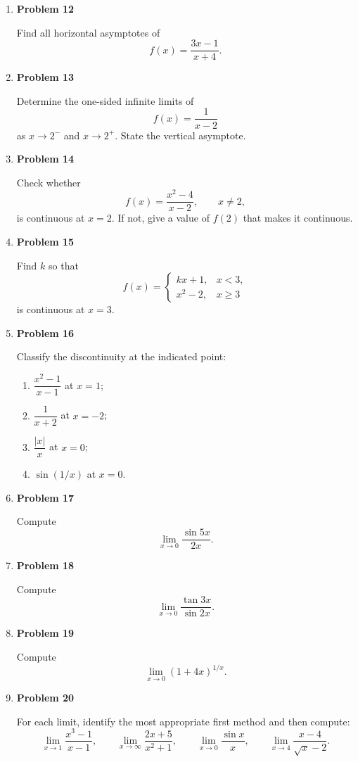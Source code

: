 \begin{enumerate}
\item \textbf{Problem 12}\par
Find all horizontal asymptotes of
\[
f(x)=\frac{3x-1}{x+4}.
\]

\item \textbf{Problem 13}\par
Determine the one-sided infinite limits of
\[
f(x)=\frac{1}{x-2}
\]
as \(x\to2^-\) and \(x\to2^+\). State the vertical asymptote.

\item \textbf{Problem 14}\par
Check whether
\[
f(x)=\frac{x^2-4}{x-2},\qquad x\ne2,
\]
is continuous at \(x=2\). If not, give a value of \(f(2)\) that makes it continuous.

\item \textbf{Problem 15}\par
Find \(k\) so that
\[
f(x)=
\begin{cases}
kx+1,&x<3,\\
x^2-2,&x\ge3
\end{cases}
\]
is continuous at \(x=3\).

\item \textbf{Problem 16}\par
Classify the discontinuity at the indicated point:
\begin{enumerate}
\item \(\dfrac{x^2-1}{x-1}\) at \(x=1\);
\item \(\dfrac{1}{x+2}\) at \(x=-2\);
\item \(\dfrac{|x|}{x}\) at \(x=0\);
\item \(\sin(1/x)\) at \(x=0\).
\end{enumerate}

\item \textbf{Problem 17}\par
Compute
\[
\lim_{x\to0}\frac{\sin 5x}{2x}.
\]

\item \textbf{Problem 18}\par
Compute
\[
\lim_{x\to0}\frac{\tan 3x}{\sin 2x}.
\]

\item \textbf{Problem 19}\par
Compute
\[
\lim_{x\to0}(1+4x)^{1/x}.
\]

\item \textbf{Problem 20}\par
For each limit, identify the most appropriate first method and then compute:
\[
\lim_{x\to1}\frac{x^3-1}{x-1},
\qquad
\lim_{x\to\infty}\frac{2x+5}{x^2+1},
\qquad
\lim_{x\to0}\frac{\sin x}{x},
\qquad
\lim_{x\to4}\frac{x-4}{\sqrt{x}-2}.
\]
\end{enumerate}

